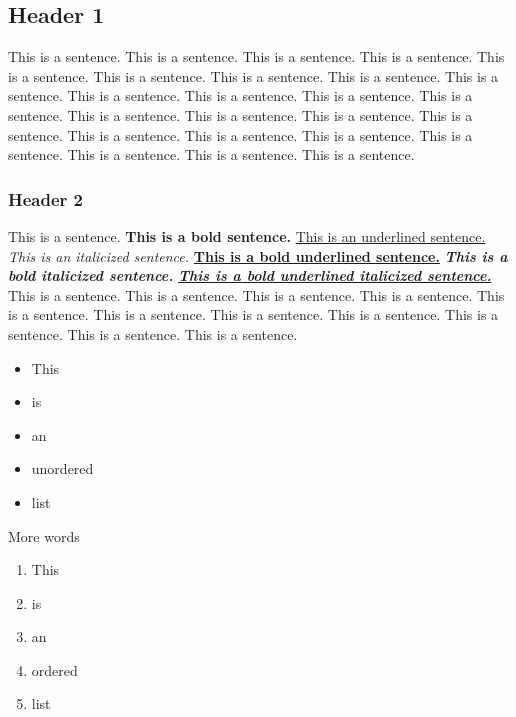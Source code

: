 \label{019e0068-aebc-7751-8771-f860a6a44c65}

\subsection{Header 1}

This is a sentence. This is a sentence. This is a sentence. This is a sentence. This is a sentence. This is a sentence. This is a sentence. This is a sentence. This is a sentence. This is a sentence. This is a sentence. This is a sentence. This is a sentence. This is a sentence. This is a sentence. This is a sentence. This is a sentence. This is a sentence. This is a sentence. This is a sentence. This is a sentence. This is a sentence. This is a sentence. This is a sentence. 

\subsubsection{Header 2}

This is a sentence. \textbf{This is a bold sentence.} \underline{This is an underlined sentence.} \textit{This is an italicized sentence.} \underline{\textbf{This is a bold underlined sentence.}}\textbf{ }\textit{\textbf{This is a bold italicized sentence.}} \underline{\textit{\textbf{This is a bold underlined italicized sentence.}}} This is a sentence. This is a sentence. This is a sentence. This is a sentence. This is a sentence. This is a sentence. This is a sentence. This is a sentence. This is a sentence. This is a sentence. This is a sentence.

\begin{itemize}
  \item This
  \item is
  \item an
  \item unordered
  \item list
\end{itemize}

More words

\begin{enumerate}
  \item This
  \item is
  \item an
  \item ordered
  \item list
\end{enumerate}

